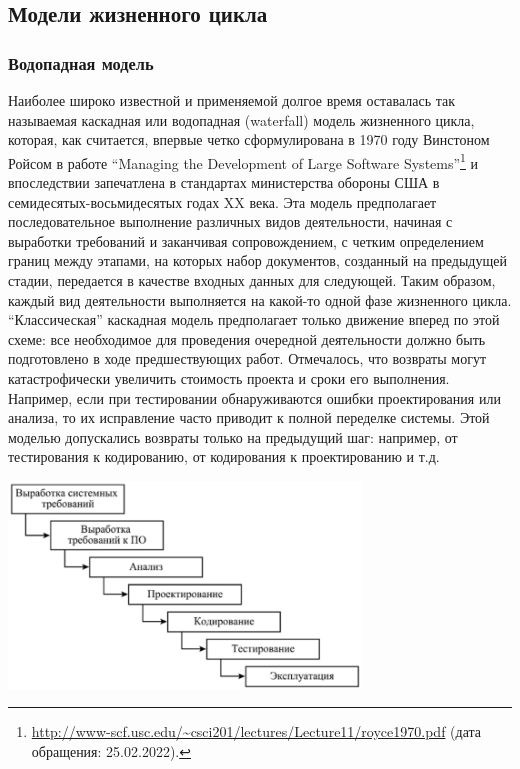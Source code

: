 \documentclass{../../text-style}
\begin{document}
\subsection{Модели жизненного цикла}

\subsubsection{Водопадная модель}
 
Наиболее широко известной и применяемой долгое время оставалась так называемая каскадная или водопадная (waterfall) модель жизненного цикла, которая, как считается, впервые четко сформулирована в 1970 году Винстоном Ройсом в работе \enquote{Managing the Development of Large Software Systems}\footnote{\url{http://www-scf.usc.edu/~csci201/lectures/Lecture11/royce1970.pdf} (дата обращения: 25.02.2022).} и впоследствии запечатлена в стандартах министерства обороны США в семидесятых-восьмидесятых годах XX века.
Эта модель предполагает последовательное выполнение различных видов деятельности, начиная с выработки требований и заканчивая сопровождением, с четким определением границ между этапами, на которых набор документов, созданный на предыдущей стадии, передается в качестве входных данных для следующей.
Таким образом, каждый вид деятельности выполняется на какой-то одной фазе жизненного цикла.
\enquote{Классическая} каскадная модель предполагает только движение вперед по этой схеме: все необходимое для проведения очередной деятельности должно быть подготовлено в ходе предшествующих работ.
Отмечалось, что возвраты могут катастрофически увеличить стоимость проекта и сроки его выполнения.
Например, если при тестировании обнаруживаются ошибки проектирования или анализа, то их исправление часто приводит к полной переделке системы.
Этой моделью допускались возвраты только на предыдущий шаг: например, от тестирования к кодированию, от кодирования к проектированию и т.д.

\begin{center}
    \includegraphics[width=0.7\textwidth]{waterfall.png}
\end{center}
\end{document}
